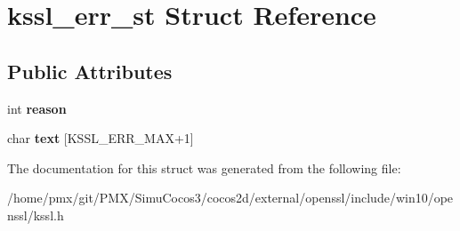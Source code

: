 \hypertarget{structkssl__err__st}{}\section{kssl\+\_\+err\+\_\+st Struct Reference}
\label{structkssl__err__st}
\subsection*{Public Attributes}
\begin{DoxyCompactItemize}
\item 
\mbox{\label{structkssl__err__st_a23922add87a55b59b3bd56d4b6fc4384}} 
int {\bfseries reason}
\item 
\mbox{\label{structkssl__err__st_a2432fe3f3f02f5319bf7da930cc356bc}} 
char {\bfseries text} \mbox{[}K\+S\+S\+L\+\_\+\+E\+R\+R\+\_\+\+M\+AX+1\mbox{]}
\end{DoxyCompactItemize}


The documentation for this struct was generated from the following file\+:\begin{DoxyCompactItemize}
\item 
/home/pmx/git/\+P\+M\+X/\+Simu\+Cocos3/cocos2d/external/openssl/include/win10/openssl/kssl.\+h\end{DoxyCompactItemize}
